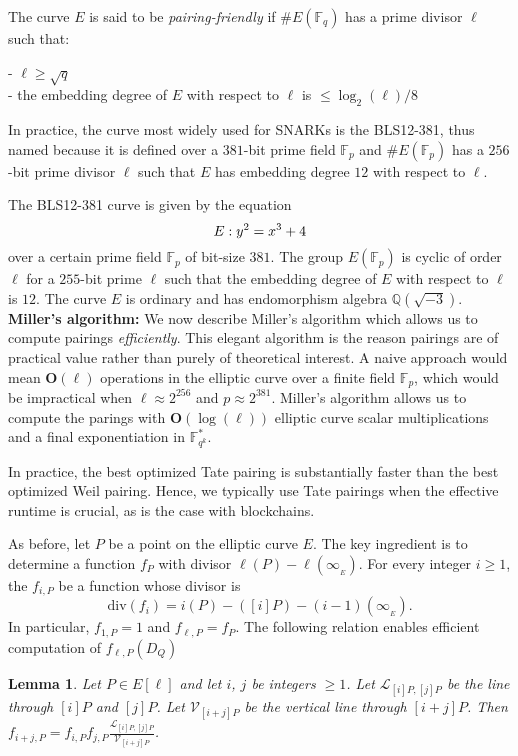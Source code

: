 \documentclass[a4paper, 11pt]{scrreprt}
\newtheorem{Lem}[Thm]{Lemma}
\numberwithin{equation}{section}
\newcommand{\bq}{\mathbb Q}
\newcommand{\bFp}{\mathbb{F}_p}
\newcommand{\bFq}{\mathbb{F}_q}
\newcommand{\bFqk}{\mathbb{F}_{q^k}}
\newcommand{\divv}{\mathrm{div}}
\newcommand{\mc}{\mathcal}
\newcommand{\mbf}{\mathbf}
\newcommand{\bO}{\mbf{O}}
\newcommand{\vs}{\vspace{-2mm}}
\newcommand{\noin}{\noindent}
\theoremstyle{plain}
\begin{document}
The curve $E$ is said to be \textit{pairing-friendly} if $\# E(\bFq)$ has a prime divisor $\ell$ such that:

\noin - $\ell\geq \sqrt{q}$\\
- the embedding degree of $E$ with respect to $\ell$ is  $\leq \log_2(\ell)/8$

In practice, the curve most widely used for SNARKs is the BLS12-381, thus named because it is defined over a $381$-bit prime field $\bFp$ and $\# E(\bFp)$ has a $256$-bit prime divisor $\ell$ such that $E$ has embedding degree $12$ with respect to $\ell$.

The BLS12-381 curve is given by the equation \vs $$E: y^2 = x^3+4 \vs $$ over a certain prime field $\bFp$ of bit-size $381$. The group $E(\bFp)$ is cyclic of order $\ell$ for a $255$-bit prime $\ell$ such that the embedding degree of $E$ with respect to $\ell$ is $12$.    The curve $E$ is ordinary and has endomorphism algebra $\bq(\sqrt{-3})$.\\


\noin \textbf{Miller's algorithm:} We now describe Miller's algorithm which allows us to compute pairings \textit{efficiently}. This elegant algorithm is the reason pairings are of practical value rather than purely of theoretical interest. A naive approach would mean $\bO(\ell)$ operations in the elliptic curve over a finite field $\bFp$, which would be impractical when $\ell \approx 2^{256}$ and $p\approx 2^{381}$. Miller's algorithm allows us to compute the parings with $\bO(\log(\ell))$  elliptic curve scalar multiplications and a final exponentiation in $\bFqk^*$.

In practice, the best optimized Tate pairing is substantially faster than the best optimized Weil pairing. Hence, we typically use Tate pairings when the     effective runtime is crucial, as is the case with blockchains.

As before, let $P$ be a point on the elliptic curve $E$. The key ingredient is to determine a function $f_{P}$ with divisor $\ell(P)-\ell(\infty_{_E})$. For every integer $i\geq 1$, the $f_{i,P}$ be a function whose divisor is \vs $$\divv(f_i) = i(P)	- ([i]P) - (i-1)(\infty_{_E}). $$ In particular, $f_{1,P} = 1$ and $f_{\ell,P} = f_{P}$. The following relation enables efficient computation of $f_{\ell,P}(D_Q)$


\begin{Lem} Let $P\in E[\ell]$ and let $i$, $j$ be integers $\geq 1$. Let $\mc{L}_{[i]P, [j]P}$ be the line through $[i]P$ and $[j]P$. Let $\mc{V}_{[i+j]P}$ be the vertical line through $[i+j]P$. Then $f_{i+j,P} = f_{i,P}f_{j,P}\frac{\mc{L}_{[i]P, [j]P}}{\mc{V}_{[i+j]P}}$.\end{Lem}
\end{document}
